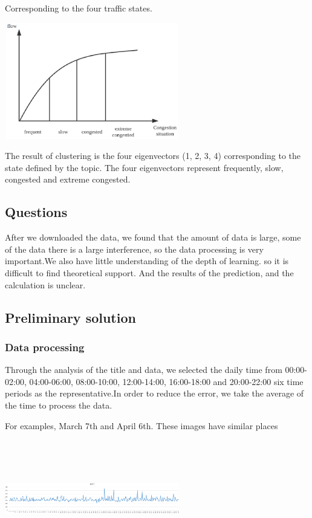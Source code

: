 \documentclass[conference,compsoc]{appendix/report}
\begin{document}
Corresponding to the four traffic states.

\includegraphics[width=3.00in,height=2.00in]{appendix/states.eps}

The result of clustering is the four eigenvectors (1, 2, 3, 4) corresponding to the state defined by the topic. The four eigenvectors represent frequently, slow, congested and extreme congested.

\subsection{Questions}
After we downloaded the data, we found that the amount of data is large, some of the data there is a large interference, so the data processing is very important.We also have little understanding of the depth of learning. so it is difficult to find theoretical support.
And the results of the prediction, and the calculation is unclear.


\subsection{Preliminary solution}
\subsubsection{Data processing}
Through the analysis of the title and data, we selected the daily time from 00:00-02:00, 04:00-06:00, 08:00-10:00, 12:00-14:00, 16:00-18:00 and 20:00-22:00 six time periods as the representative.In order to reduce the error, we take the average of the time to process the data.

For examples, March 7th and April 6th. These images have similar places

\includegraphics[width=3.00in,height=2.00in]{appendix/0307.eps}
\end{document}
